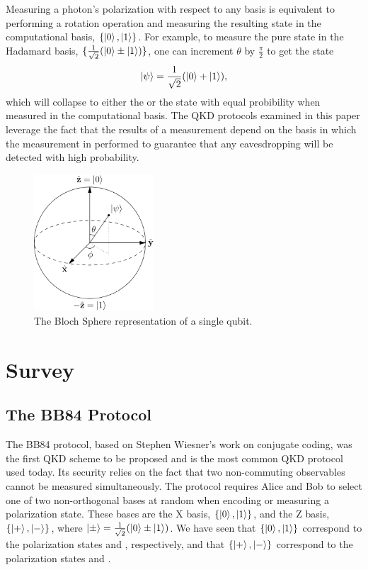 \documentclass[conference]{IEEEtran}
\begin{document}
Measuring a photon's polarization with respect to any basis is equivalent to performing a rotation operation and measuring the resulting state in the computational basis, $\{\left\vert{0}\right\rangle, \left\vert{1}\right\rangle\}$. For example, to measure the pure state  in the Hadamard basis, $\{\frac{1}{\sqrt{2}}(\left\vert{0}\right\rangle\pm\left\vert{1}\right\rangle)\}$, one can increment $\theta$ by $\frac{\pi}{2}$ to get the state \[ \left\vert{\psi}\right\rangle = \frac{1}{\sqrt{2}}(\left\vert{0}\right\rangle + \left\vert{1}\right\rangle), \] which will collapse to either the  or the  state with equal probibility when measured in the computational basis. The QKD protocols examined in this paper leverage the fact that the results of a measurement depend on the basis in which the measurement in performed to guarantee that any eavesdropping will be detected with high probability.\\
\begin{figure}[h]
  \hspace*{1.2cm}\includegraphics[width=0.4\textwidth]{bloch-sphere.png}
  \caption{The Bloch Sphere representation of a single qubit\cite{Wikipedia}.}
  \label{fig:blochSphere}
  \end{figure}

\section{Survey}
\subsection{The BB84 Protocol}
The BB84 protocol, based on Stephen Wiesner's work on conjugate coding\cite{Wiesner}, was the first QKD scheme to be proposed and is the most common QKD protocol used today. Its security relies on the fact that two non-commuting observables cannot be measured simultaneously. The protocol requires Alice and Bob to select one of two non-orthogonal bases at random when encoding or measuring a polarization state. These bases are the X basis, $\{\left\vert{0}\right\rangle, \left\vert{1}\right\rangle\}$, and the Z basis, $\{\left\vert{+}\right\rangle, \left\vert{-}\right\rangle\}$, where $\left\vert{\pm}\right\rangle = \frac{1}{\sqrt{2}}(\left\vert{0}\right\rangle\pm\left\vert{1}\right\rangle)$. We have seen that $\{\left\vert{0}\right\rangle, \left\vert{1}\right\rangle\}$ correspond to the polarization states \ket{\uparrow} and \ket{\rightarrow}, respectively, and that $\{\left\vert{+}\right\rangle, \left\vert{-}\right\rangle\}$ correspond to the polarization states \ket{\nwarrow} and \ket{\nearrow}.\\
\end{document}
